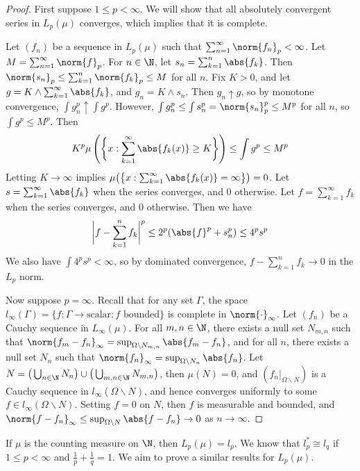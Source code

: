 \documentclass[a4paper]{article}
\begin{document}
\begin{proof}
  First suppose $1\leq p<\infty$. We will show that all absolutely convergent series in $L_p(\mu)$ converges, which implies that it is complete.

  Let $(f_n)$ be a sequence in $L_p(\mu)$ such that $\sum_{n=1}^\infty\norm{f_n}_p<\infty$. Let $M=\sum_{n=1}^\infty\norm{f}_p$. For $n\in\N$, let $s_n=\sum_{k=1}^n\abs{f_k}$. Then $\norm{s_n}_p\leq\sum_{k=1}^n\norm{f_k}_p\leq M$ for all $n$. Fix $K>0$, and let $g=K\land\sum_{k=1}^\infty\abs{f_k}$, and $g_n=K\land s_n$. Then $g_n\uparrow g$, so by monotone convergence, $\int g_n^p\uparrow\int g^p$. However, $\int g_n^p\leq\int s_n^p=\norm{s_n}_p^p\leq M^p$ for all $n$, so $\int g^p\leq M^p$. Then
  \[
    K^p\mu\left(\bigg\{x:\sum_{k=1}^\infty\abs{f_k(x)}\geq K\bigg\}\right)\leq\int g^p\leq M^p
  \]
  Letting $K\to\infty$ implies $\mu\big(\big\{x:\sum_{k=1}^\infty\abs{f_k(x)}=\infty\big\}\big)=0$. Let $s=\sum_{k=1}^\infty\abs{f_k}$ when the series converges, and 0 otherwise. Let $f=\sum_{k=1}^\infty f_k$ when the series converges, and 0 otherwise. Then we have
  \[
    \bigg|f-\sum_{k=1}^n f_k\bigg|^p\leq 2^p(\abs{f}^p+s_n^p)\leq 4^p s^p
  \]
  We also have $\int 4^p s^p<\infty$, so by dominated convergence, $f-\sum_{k=1}^n f_k\to 0$ in the $L_p$ norm.

  Now suppose $p=\infty$. Recall that for any set $\Gamma$, the space $l_\infty(\Gamma)=\{f:\Gamma\to\text{scalar}:f\text{ bounded}\}$ is complete in $\norm{\cdot}_\infty$. Let $(f_n)$ be a Cauchy sequence in $L_\infty(\mu)$. For all $m,n\in\N$, there exists a null set $N_{m,n}$ such that $\norm{f_m-f_n}_\infty=\sup_{\Omega\backslash N_{m,n}}\abs{f_m-f_n}$, and for all $n$, there exists a null set $N_n$ such that $\norm{f_n}_\infty=\sup_{\Omega\backslash N_n}\abs{f_n}$. Let $N=\big(\bigcup_{n\in\N}N_n\big)\cup\big(\bigcup_{m,n\in\N}N_{m,n}\big)$, then $\mu(N)=0$, and $(f_n|_{\Omega\backslash N})$ is a Cauchy sequence in $l_\infty(\Omega\backslash N)$, and hence converges uniformly to some $f\in l_\infty(\Omega\backslash N)$. Setting $f=0$ on $N$, then $f$ is measurable and bounded, and $\norm{f-f_n}_\infty\leq\sup_{\Omega\backslash N}\abs{f-f_n}\to 0$ as $n\to\infty$.
\end{proof}

\begin{eg}
  If $\mu$ is the counting measure on $\N$, then $L_p(\mu)=l_p$. We know that $l_p^*\cong l_q$ if $1\leq p<\infty$ and $\frac{1}{p}+\frac{1}{q}=1$. We aim to prove a similar results for $L_p(\mu)$.
\end{eg}
\end{document}
